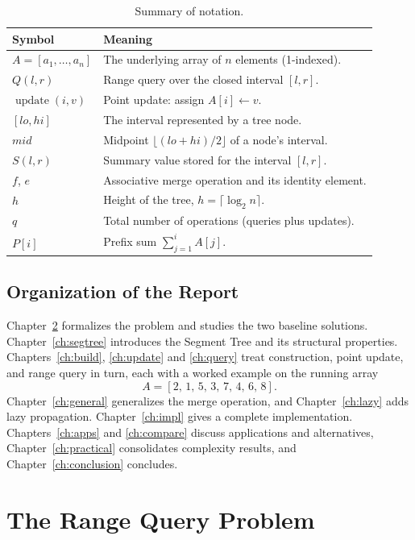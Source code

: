 \documentclass[
  11pt,
  a4paper,
  twoside=false,
  numbers=noenddot,
  headings=big,
  parskip=half,
  toc=bibliography,
  toc=listof,
  bibliography=totoc
]{scrreprt}
\newcounter{example}[chapter]
\newcommand{\tblhead}[1]{\textbf{\sffamily #1}}
\begin{document}
\begin{table}[h]
\centering
\caption{Summary of notation.}
\label{tab:notation}
\begin{tabularx}{\textwidth}{@{}>{\centering\arraybackslash}p{2.6cm} Y@{}}
\toprule
\tblhead{Symbol} & \tblhead{Meaning} \\
\midrule
$A=[a_1,\dots,a_n]$ & The underlying array of $n$ elements (1-indexed). \\
$Q(l,r)$ & Range query over the closed interval $[l,r]$. \\
$\operatorname{update}(i,v)$ & Point update: assign $A[i]\leftarrow v$. \\
$[lo,hi]$ & The interval represented by a tree node. \\
$mid$ & Midpoint $\lfloor (lo+hi)/2\rfloor$ of a node's interval. \\
$S(l,r)$ & Summary value stored for the interval $[l,r]$. \\
$f$, $e$ & Associative merge operation and its identity element. \\
$h$ & Height of the tree, $h=\lceil\log_2 n\rceil$. \\
$q$ & Total number of operations (queries plus updates). \\
$P[i]$ & Prefix sum $\sum_{j=1}^{i}A[j]$. \\
\bottomrule
\end{tabularx}
\end{table}

\section{Organization of the Report}
Chapter~\ref{ch:problem} formalizes the problem and studies the two baseline solutions. Chapter~\ref{ch:segtree} introduces the Segment Tree and its structural properties. Chapters~\ref{ch:build}, \ref{ch:update} and \ref{ch:query} treat construction, point update, and range query in turn, each with a worked example on the running array
\[
A = [2,\,1,\,5,\,3,\,7,\,4,\,6,\,8].
\]
Chapter~\ref{ch:general} generalizes the merge operation, and Chapter~\ref{ch:lazy} adds lazy propagation. Chapter~\ref{ch:impl} gives a complete implementation. Chapters~\ref{ch:apps} and \ref{ch:compare} discuss applications and alternatives, Chapter~\ref{ch:practical} consolidates complexity results, and Chapter~\ref{ch:conclusion} concludes.

\chapter{The Range Query Problem}
\label{ch:problem}
\end{document}

